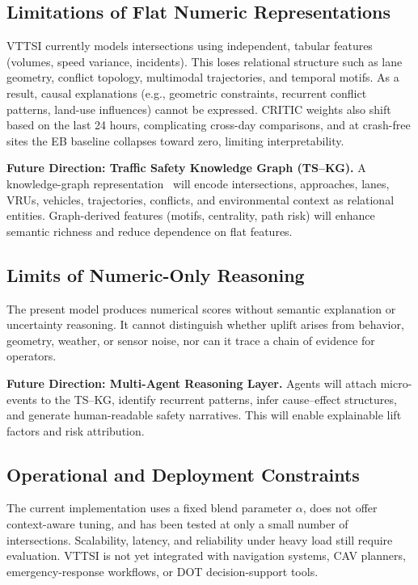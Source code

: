 \documentclass[conference]{IEEEtran}
\begin{document}
\subsection{Limitations of Flat Numeric Representations}

VTTSI currently models intersections using independent, tabular features (volumes, speed
variance, incidents). This loses relational structure such as lane geometry, conflict
topology, multimodal trajectories, and temporal motifs. As a result, causal explanations
(e.g., geometric constraints, recurrent conflict patterns, land-use influences) cannot be
expressed. CRITIC weights also shift based on the last 24 hours, complicating
cross-day comparisons, and at crash-free sites the EB baseline collapses toward zero,
limiting interpretability.

\textbf{Future Direction: Traffic Safety Knowledge Graph (TS--KG).}
A knowledge-graph representation~\cite{cusati2025agentickg} will encode intersections,
approaches, lanes, VRUs, vehicles, trajectories, conflicts, and environmental context as
relational entities. Graph-derived features (motifs, centrality, path risk) will enhance
semantic richness and reduce dependence on flat features.

\subsection{Limits of Numeric-Only Reasoning}

The present model produces numerical scores without semantic explanation or uncertainty
reasoning. It cannot distinguish whether uplift arises from behavior, geometry, weather,
or sensor noise, nor can it trace a chain of evidence for operators.

\textbf{Future Direction: Multi-Agent Reasoning Layer.}
Agents will attach micro-events to the TS--KG, identify recurrent patterns, infer
cause–effect structures, and generate human-readable safety narratives. This will enable
explainable lift factors and risk attribution.

\subsection{Operational and Deployment Constraints}

The current implementation uses a fixed blend parameter $\alpha$, does not offer
context-aware tuning, and has been tested at only a small number of intersections.
Scalability, latency, and reliability under heavy load still require evaluation. VTTSI is
not yet integrated with navigation systems, CAV planners, emergency-response workflows,
or DOT decision-support tools.
\end{document}
